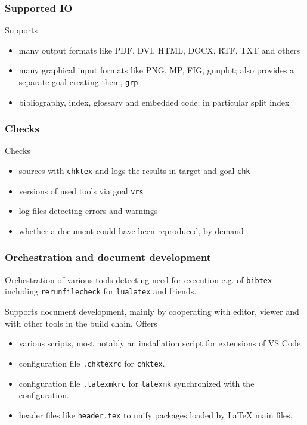 \begin{frame}
  \frametitle{Supported IO}
  Supports 
  \begin{itemize}
    \item
    many output formats like PDF, DVI, HTML, DOCX, RTF, TXT and others
    \item
    many graphical input formats like PNG, MP, FIG, gnuplot; 
    also provides a separate goal creating them, \texttt{grp} 
    \item
    bibliography, index, glossary and embedded code; in particular split index
  \end{itemize}
\end{frame}


\begin{frame}
  \frametitle{Checks}
  Checks 
  \begin{itemize}
    \item
    sources with \texttt{chktex} and logs the results in target and goal \texttt{chk} 
    \item
    versions of used tools via goal \texttt{vrs} 
    \item
    log files detecting errors and warnings 
    \item
    whether a document could have been reproduced, by demand 
  \end{itemize}
\end{frame}

\begin{frame}
  \frametitle{Orchestration and document development}
  Orchestration of various tools detecting need for execution e.g.
  of \texttt{bibtex} including \texttt{rerunfilecheck} for \texttt{lualatex} and friends.

  Supports document development, mainly by cooperating with editor, viewer and with other tools in the build chain. 
  Offers 
  \begin{itemize}
    \item various scripts, 
    most notably an installation script for extensions of VS Code.
    \item configuration file \texttt{.chktexrc} for \texttt{chktex}.
    \item configuration file \texttt{.latexmkrc} for \texttt{latexmk} 
    synchronized with the configuration.
    \item header files like \texttt{header.tex} 
    to unify packages loaded by \LaTeX{} main files. %
  \end{itemize}
\end{frame}


